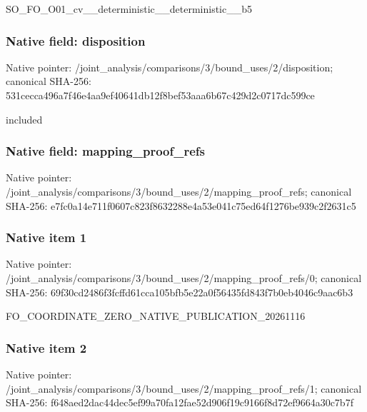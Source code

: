 \documentclass[10pt,a4paper]{article}
\begin{document}
\begingroup\raggedright\sloppy SO\_\allowbreak{}FO\_\allowbreak{}O01\_\allowbreak{}cv\_\allowbreak{}\_\allowbreak{}deterministic\_\allowbreak{}\_\allowbreak{}deterministic\_\allowbreak{}\_\allowbreak{}b5\par\endgroup

\subsubsection{Native field: disposition}
Native pointer: /joint\_\allowbreak{}analysis/comparisons/3/bound\_\allowbreak{}uses/2/disposition; canonical SHA-256: 531cecca496a7f46e4aa9ef40641db12f8bef53aaa6b67c429d2c0717dc599ce

\begingroup\raggedright\sloppy included\par\endgroup

\subsubsection{Native field: mapping\_\allowbreak{}proof\_\allowbreak{}refs}
Native pointer: /joint\_\allowbreak{}analysis/comparisons/3/bound\_\allowbreak{}uses/2/mapping\_\allowbreak{}proof\_\allowbreak{}refs; canonical SHA-256: e7fc0a14e711f0607c823f8632288e4a53e041c75ed64f1276be939c2f2631c5

\subsubsection{Native item 1}
Native pointer: /joint\_\allowbreak{}analysis/comparisons/3/bound\_\allowbreak{}uses/2/mapping\_\allowbreak{}proof\_\allowbreak{}refs/0; canonical SHA-256: 69f30cd2486f3fcffd61cca105bfb5e22a0f56435fd843f7b0eb4046c9aac6b3

\begingroup\raggedright\sloppy FO\_\allowbreak{}COORDINATE\_\allowbreak{}ZERO\_\allowbreak{}NATIVE\_\allowbreak{}PUBLICATION\_\allowbreak{}20261116\par\endgroup

\subsubsection{Native item 2}
Native pointer: /joint\_\allowbreak{}analysis/comparisons/3/bound\_\allowbreak{}uses/2/mapping\_\allowbreak{}proof\_\allowbreak{}refs/1; canonical SHA-256: f648aed2dac44dec5ef99a70fa12fae52d906f19c9166f8d72ef9664a30c7b7f
\end{document}
